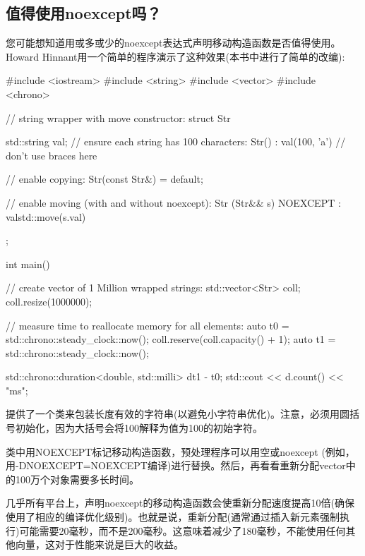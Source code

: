 \subsection{值得使用noexcept吗？}

您可能想知道用或多或少的noexcept表达式声明移动构造函数是否值得使用。Howard Hinnant用一个简单的程序演示了这种效果(本书中进行了简单的改编):

\begin{cppcode}
#include <iostream>
#include <string>
#include <vector>
#include <chrono>

// string wrapper with move constructor:
struct Str
{
	std::string val;
	// ensure each string has 100 characters:
	Str()
	: val(100, 'a') { // don’t use braces here
	}

	// enable copying:
	Str(const Str&) = default;

	// enable moving (with and without noexcept):
	Str (Str&& s) NOEXCEPT
	: val{std::move(s.val)} {
	}
};

int main()
{
	// create vector of 1 Million wrapped strings:
	std::vector<Str> coll;
	coll.resize(1000000);

	// measure time to reallocate memory for all elements:
	auto t0 = std::chrono::steady_clock::now();
	coll.reserve(coll.capacity() + 1);
	auto t1 = std::chrono::steady_clock::now();

	std::chrono::duration<double, std::milli> d{t1 - t0};
	std::cout << d.count() << "ms\n";
}
\end{cppcode}

提供了一个类来包装长度有效的字符串(以避免小字符串优化)。注意，必须用圆括号初始化，因为大括号会将100解释为值为100的初始字符。

类中用NOEXCEPT标记移动构造函数，预处理程序可以用空或noexcept (例如，用-DNOEXCEPT=NOEXCEPT编译)进行替换。然后，再看看重新分配vector中的100万个对象需要多长时间。

几乎所有平台上，声明noexcept的移动构造函数会使重新分配速度提高10倍(确保使用了相应的编译优化级别)。也就是说，重新分配(通常通过插入新元素强制执行)可能需要20毫秒，而不是200毫秒。这意味着减少了180毫秒，不能使用任何其他向量，这对于性能来说是巨大的收益。





